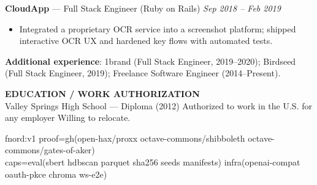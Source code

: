 \documentclass[10pt]{article}
\begin{document}
\textbf{CloudApp} --- Full Stack Engineer (Ruby on Rails) \hfill \textit{Sep 2018 -- Feb 2019}\\
\vspace{-6pt}
\begin{itemize}
  \setlength\itemsep{-2pt}
  \setlength\parskip{0pt}
  \setlength\parsep{0pt}
  \item Integrated a proprietary OCR service into a screenshot platform; shipped interactive OCR UX and hardened key flows with automated tests.
\end{itemize}

\textbf{Additional experience}: 1brand (Full Stack Engineer, 2019--2020); Birdseed (Full Stack Engineer, 2019); Freelance Software Engineer (2014--Present).

\vspace{4pt}
\textbf{EDUCATION / WORK AUTHORIZATION}\\
Valley Springs High School --- Diploma (2012) \;\textbar\; Authorized to work in the U.S. for any employer \;\textbar\; Willing to relocate.

\vspace{2pt}
{\scriptsize\ttfamily
fnord:v1\; proof=gh(open-hax/proxx octave-commons/shibboleth octave-commons/gates-of-aker)\\
caps=eval(sbert hdbscan parquet sha256 seeds manifests)\; infra(openai-compat oauth-pkce chroma ws-e2e)
}
\end{document}
